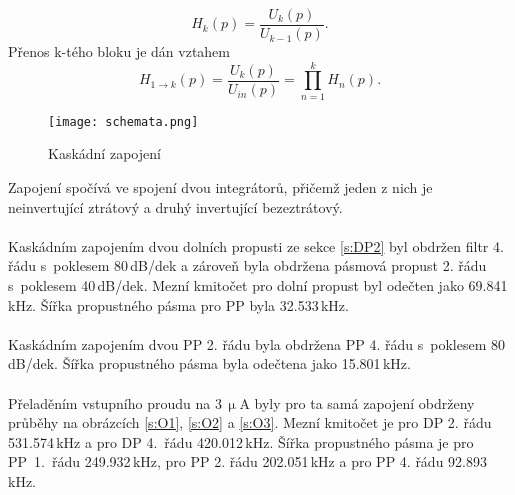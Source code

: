 \begin{equation}
H_k(p) = \frac{U_k (p)}{U_{k-1}(p)}.
\end{equation}
Přenos k-tého bloku je dán vztahem
\begin{equation}
H_{1 \rightarrow k}(p) = \frac{U_k (p)}{U_{in}(p)} = \prod _{n=1}^{k} H_n(p).
\end{equation}
\begin{figure}[h]
\centering
\texttt{[image: schemata.png]}
\caption[Kaskádní zapojení]{Kaskádní zapojení \cite{9}}
\end{figure}
\noindent Zapojení spočívá ve spojení dvou integrátorů, přičemž jeden z nich je neinvertující ztrátový a druhý invertující bezeztrátový. 
\\
\\
\noindent Kaskádním zapojením dvou dolních propusti ze sekce \ref{s:DP2} byl obdržen filtr 4. řádu s~poklesem 80\,dB/dek a zároveň byla obdržena pásmová propust 2. řádu s~poklesem 40\,dB/dek. Mezní kmitočet pro dolní propust byl odečten jako 69.841\,kHz. Šířka propustného pásma pro PP byla 32.533\,kHz. \\
\\
\noindent Kaskádním zapojením dvou PP 2. řádu byla obdržena PP 4. řádu s~poklesem 80\,dB/dek. Šířka propustného pásma byla odečtena jako 15.801\,kHz.\\
\\
\noindent Přeladěním vstupního proudu na 3\,$\upmu$A byly pro ta samá zapojení obdrženy průběhy na obrázcích \ref{s:O1}, \ref{s:O2} a  \ref{s:O3}. Mezní kmitočet je pro DP 2. řádu 531.574\,kHz a pro DP 4.~řádu 420.012\,kHz. Šířka propustného pásma je pro PP~1.~řádu 249.932\,kHz, pro PP 2. řádu 202.051\,kHz a pro PP 4. řádu 92.893\,kHz.